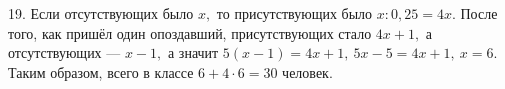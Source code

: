 19. Если отсутствующих было $x,$ то присутствующих было $x:0,25=4x.$ После того, как пришёл один опоздавший, присутствующих стало $4x+1,$ а отсутствующих --- $x-1,$ а значит $5(x-1)=4x+1,\ 5x-5=4x+1,\ x=6.$ Таким образом, всего в классе $6+4\cdot6=30$ человек.\\
